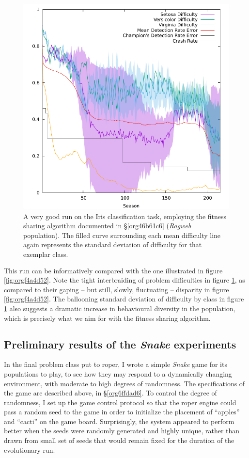 \documentclass[12pt,glossary]{dalthesis}
\begin{document}
\begin{figure}[htbp]
\centering
\includegraphics[width=.9\linewidth]{../images/plots/sharing.pdf}
\caption{\label{fig:org579cb03}
A very good run on the Iris classification task, employing the fitness sharing algorithm documented in \S \ref{org46b61c6} (\emph{Ragweb} population). The filled curve surrounding each mean difficulty line again represents the standard deviation of difficulty for that exemplar class.}
\end{figure}



This run can be informatively compared with the one illustrated in figure
\ref{fig:orgf4a4d52}. Note the tight interbraiding of problem difficulties in
figure \ref{fig:org579cb03}, as compared to their gaping -- but still, slowly,
fluctuating -- disparity in figure \ref{fig:orgf4a4d52}. The ballooning standard
deviation of difficulty by class in figure \ref{fig:org579cb03} also suggests
a dramatic increase in behavioural diversity in the population, which is
precisely what we aim for with the fitness sharing algorithm.


\subsection{Preliminary results of the \emph{Snake} experiments}
\label{sec:org51b6318}
\label{org2c489d3}

In the final problem class put to \gls{roper}, I wrote a simple \emph{Snake} game
\cite{snakefight} for its populations to play, to see how they may respond to a
dynamically changing environment, with moderate to high degrees of randomness.
The specifications of the game are described above, in \S \ref{org6ffdad6}.
To control the degree of randomness, I set up the game control protocol so that
the \gls{roper} engine could pass a random seed to the game in order to initialize
the placement of ``apples'' and ``cacti'' on the game board. Surprisingly, the 
system appeared to perform better when the seeds were randomly generated and
highly unique, rather than drawn from small set of seeds that would remain fixed
for the duration of the evolutionary run. 
\end{document}
